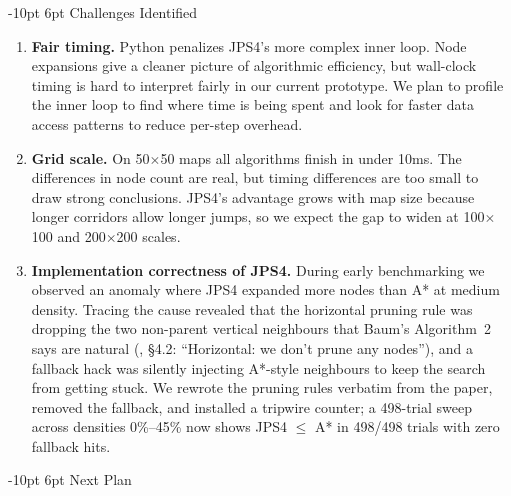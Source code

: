 \documentclass[11pt,twocolumn,a4paper]{article}
\makeatletter
\renewcommand\section{\@startsection{section}{1}{\z@}%
  {-10pt \@plus -2pt \@minus -2pt}%
  {6pt \@plus 2pt}%
  {\normalfont\large\bfseries}}
\makeatother
\begin{document}
\section{Challenges Identified}

\begin{enumerate}
  \item \textbf{Fair timing.} Python penalizes JPS4's more complex inner loop.
    Node expansions give a cleaner picture of algorithmic efficiency, but
    wall-clock timing is hard to interpret fairly in our current prototype.
    We plan to profile the inner loop to find where time is being spent and
    look for faster data access patterns to reduce per-step overhead.

  \item \textbf{Grid scale.} On 50$\times$50 maps all algorithms finish in
    under 10ms. The differences in node count are real, but timing differences
    are too small to draw strong conclusions. JPS4's advantage grows with map
    size because longer corridors allow longer jumps, so we expect the gap to
    widen at 100$\times$100 and 200$\times$200 scales.

  \item \textbf{Implementation correctness of JPS4.} During early
    benchmarking we observed an anomaly where JPS4 expanded more nodes than
    A* at medium density. Tracing the cause revealed that the horizontal
    pruning rule was dropping the two non-parent vertical neighbours that
    Baum's Algorithm~2 says are natural (\cite{baum2025}, \S4.2: ``Horizontal:
    we don't prune any nodes''), and a fallback hack was silently injecting
    A*-style neighbours to keep the search from getting stuck. We rewrote
    the pruning rules verbatim from the paper, removed the fallback, and
    installed a tripwire counter; a 498-trial sweep across densities 0\%--45\%
    now shows JPS4 $\leq$ A* in 498/498 trials with zero fallback hits.
\end{enumerate}

\section{Next Plan}
\end{document}
